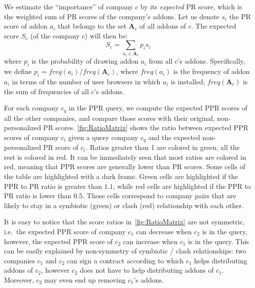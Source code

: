 \documentclass[ijoc,nonblindrev]{informs3} %
\numberwithin{equation}{subsection}
\begin{document}
We estimate the ``importance'' of company $c$ by its \emph{expected} PR score, which is the weighted sum of PR scores of the company's addons. Let us denote $s_i$ the PR score of addon $a_i$ that belongs to the set $\mathbf{A}_c$ of all addons of $c$. The expected score $S_c$ (of the company $c$) will then be:
$$
S_c = \sum_{a_i \in \mathbf{A}_c} p_i s_i
$$
where $p_i$ is the probability of drawing addon $a_i$ from all $c$'s addons. Specifically, we define $p_i = freq(a_i) / freq(\mathbf{A}_c)$, where $freq(a_i)$ is the frequency of addon $a_i$ in terms of the number of user browsers in which $a_i$ is installed; $freq(\mathbf{A}_c)$ is the sum of frequencies of all $c$'s addons.

For each company $c_q$ in the PPR query, we compute the expected PPR scores of all the other companies, and compare those scores with their original, non-personalized PR scores. \autoref{fig:RatioMatrix} shows the ratio between expected PPR scores of company $c_i$ given a query company $c_q$ and the expected non-personalized PR score of $c_i$. Ratios greater than 1 are colored in green, all the rest is colored in red. It can be immediately seen that most ratios are colored in red, meaning that PPR scores are generally lower than PR scores. Some cells of the table are highlighted with a dark frame. Green cells are highlighted if the PPR to PR ratio is greater than $1.1$, while red cells are highlighted if the PPR to PR ratio is lower than $0.5$. Those cells correspond to company pairs that are likely to stay in a symbiotic (green) or clash (red) relationship with each other.

It is easy to notice that the score ratios in~\autoref{fig:RatioMatrix} are not symmetric, i.e.~the expected PPR score of company $c_1$ can decrease when $c_2$ is in the query, however, the expected PPR score of $c_2$ can increase when $c_1$ is in the query. This can be easily explained by non-symmetry of symbiotic / clash relationships: two companies $c_1$ and $c_2$ can sign a contract according to which $c_1$ helps distributing addons of $c_2$, however $c_2$ does not have to help distributing addons of $c_1$. Moreover, $c_2$ may even end up removing $c_1$'s addons. 
\end{document}

